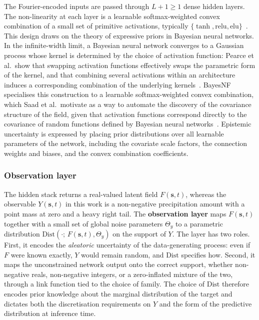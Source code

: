 The Fourier-encoded inputs are passed through $L+1 \geq 1$ dense hidden
layers. The non-linearity at each layer is a learnable softmax-weighted
convex combination of a small set of primitive activations, typically
$\{\tanh, \mathrm{relu}, \mathrm{elu}\}$~\cite{saad2024bnf}. This design
draws on the theory of expressive priors in Bayesian neural networks. In
the infinite-width limit, a Bayesian neural network converges to a
Gaussian process whose kernel is determined by the choice of activation
function: Pearce et al.\ show that swapping activation functions
effectively swaps the parametric form of the kernel, and that combining
several activations within an architecture induces a corresponding
combination of the underlying kernels~\cite{pearce2020expressive}.
BayesNF specialises this construction to a learnable softmax-weighted
convex combination, which Saad et al.\ motivate as a way to automate the
discovery of the covariance structure of the field, given that
activation functions correspond directly to the covariance of random
functions defined by Bayesian neural networks~\cite{saad2024bnf}.
Epistemic uncertainty is expressed by placing prior distributions over
all learnable parameters of the network, including the covariate scale
factors, the connection weights and biases, and the convex combination
coefficients.

\subsubsection*{Observation layer}

The hidden stack returns a real-valued latent field $F(\mathbf{s},t)$,
whereas the observable $Y(\mathbf{s},t)$ in this work is a non-negative
precipitation amount with a point mass at zero and a heavy right tail.
The \textbf{observation layer} maps $F(\mathbf{s},t)$ together with a
small set of global noise parameters $\Theta_y$ to a parametric
distribution $\mathrm{Dist}(\cdot;\,F(\mathbf{s},t),\Theta_y)$ on the
support of $Y$. The layer has two roles. First, it encodes the
\emph{aleatoric} uncertainty of the data-generating process: even if
$F$ were known exactly, $Y$ would remain random, and $\mathrm{Dist}$
specifies how. Second, it maps the unconstrained network output onto
the correct support, whether non-negative reals, non-negative integers,
or a zero-inflated mixture of the two, through a link function tied to
the choice of family. The choice of $\mathrm{Dist}$ therefore encodes
prior knowledge about the marginal distribution of the target and
dictates both the discretisation requirements on $Y$ and the form of
the predictive distribution at inference time.

